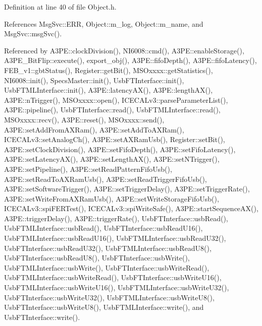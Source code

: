 Definition at line 40 of file Object.\+h.



References Msg\+Svc\+::\+E\+RR, Object\+::m\+\_\+log, Object\+::m\+\_\+name, and Msg\+Svc\+::msg\+Svc().



Referenced by A3\+P\+E\+::clock\+Division(), N\+I6008\+::cmd(), A3\+P\+E\+::enable\+Storage(), A3\+P\+E\+\_\+\+Bit\+Flip\+::execute(), export\+\_\+obj(), A3\+P\+E\+::fifo\+Depth(), A3\+P\+E\+::fifo\+Latency(), F\+E\+B\+\_\+v1\+::gbt\+Status(), Register\+::get\+Bit(), M\+S\+Oxxxx\+::get\+Statistics(), N\+I6008\+::init(), Specs\+Master\+::init(), Usb\+F\+T\+Interface\+::init(), Usb\+F\+T\+M\+L\+Interface\+::init(), A3\+P\+E\+::latency\+A\+X(), A3\+P\+E\+::length\+A\+X(), A3\+P\+E\+::n\+Trigger(), M\+S\+Oxxxx\+::open(), I\+C\+E\+C\+A\+Lv3\+::parse\+Parameter\+List(), A3\+P\+E\+::pipeline(), Usb\+F\+T\+Interface\+::read(), Usb\+F\+T\+M\+L\+Interface\+::read(), M\+S\+Oxxxx\+::recv(), A3\+P\+E\+::reset(), M\+S\+Oxxxx\+::send(), A3\+P\+E\+::set\+Add\+From\+A\+X\+Ram(), A3\+P\+E\+::set\+Add\+To\+A\+X\+Ram(), I\+C\+E\+C\+A\+Lv3\+::set\+Analog\+Ch(), A3\+P\+E\+::set\+A\+X\+Ram\+Usb(), Register\+::set\+Bit(), A3\+P\+E\+::set\+Clock\+Division(), A3\+P\+E\+::set\+Fifo\+Depth(), A3\+P\+E\+::set\+Fifo\+Latency(), A3\+P\+E\+::set\+Latency\+A\+X(), A3\+P\+E\+::set\+Length\+A\+X(), A3\+P\+E\+::set\+N\+Trigger(), A3\+P\+E\+::set\+Pipeline(), A3\+P\+E\+::set\+Read\+Pattern\+Fifo\+Usb(), A3\+P\+E\+::set\+Read\+To\+A\+X\+Ram\+Usb(), A3\+P\+E\+::set\+Read\+Trigger\+Fifo\+Usb(), A3\+P\+E\+::set\+Software\+Trigger(), A3\+P\+E\+::set\+Trigger\+Delay(), A3\+P\+E\+::set\+Trigger\+Rate(), A3\+P\+E\+::set\+Write\+From\+A\+X\+Ram\+Usb(), A3\+P\+E\+::set\+Write\+Storage\+Fifo\+Usb(), I\+C\+E\+C\+A\+Lv3\+::spi\+F\+E\+R\+Test(), I\+C\+E\+C\+A\+Lv3\+::spi\+Write\+Safe(), A3\+P\+E\+::start\+Sequence\+A\+X(), A3\+P\+E\+::trigger\+Delay(), A3\+P\+E\+::trigger\+Rate(), Usb\+F\+T\+Interface\+::usb\+Read(), Usb\+F\+T\+M\+L\+Interface\+::usb\+Read(), Usb\+F\+T\+Interface\+::usb\+Read\+U16(), Usb\+F\+T\+M\+L\+Interface\+::usb\+Read\+U16(), Usb\+F\+T\+M\+L\+Interface\+::usb\+Read\+U32(), Usb\+F\+T\+Interface\+::usb\+Read\+U32(), Usb\+F\+T\+M\+L\+Interface\+::usb\+Read\+U8(), Usb\+F\+T\+Interface\+::usb\+Read\+U8(), Usb\+F\+T\+Interface\+::usb\+Write(), Usb\+F\+T\+M\+L\+Interface\+::usb\+Write(), Usb\+F\+T\+Interface\+::usb\+Write\+Read(), Usb\+F\+T\+M\+L\+Interface\+::usb\+Write\+Read(), Usb\+F\+T\+Interface\+::usb\+Write\+U16(), Usb\+F\+T\+M\+L\+Interface\+::usb\+Write\+U16(), Usb\+F\+T\+M\+L\+Interface\+::usb\+Write\+U32(), Usb\+F\+T\+Interface\+::usb\+Write\+U32(), Usb\+F\+T\+M\+L\+Interface\+::usb\+Write\+U8(), Usb\+F\+T\+Interface\+::usb\+Write\+U8(), Usb\+F\+T\+M\+L\+Interface\+::write(), and Usb\+F\+T\+Interface\+::write().


